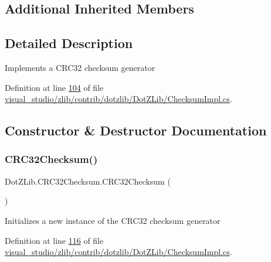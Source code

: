 \subsection*{Additional Inherited Members}


\subsection{Detailed Description}
Implements a C\+R\+C32 checksum generator 



Definition at line \hyperlink{visual__studio_2zlib_2contrib_2dotzlib_2_dot_z_lib_2_checksum_impl_8cs_source_l00104}{104} of file \hyperlink{visual__studio_2zlib_2contrib_2dotzlib_2_dot_z_lib_2_checksum_impl_8cs_source}{visual\+\_\+studio/zlib/contrib/dotzlib/\+Dot\+Z\+Lib/\+Checksum\+Impl.\+cs}.



\subsection{Constructor \& Destructor Documentation}
\mbox{\label{class_dot_z_lib_1_1_c_r_c32_checksum_aae1fb7dbf6c57d17c321d0065cd608ca}} 
\subsubsection{\texorpdfstring{C\+R\+C32\+Checksum()}{CRC32Checksum()}\hspace{0.1cm}{\footnotesize\ttfamily [1/4]}}
{\footnotesize\ttfamily Dot\+Z\+Lib.\+C\+R\+C32\+Checksum.\+C\+R\+C32\+Checksum (\begin{DoxyParamCaption}{ }\end{DoxyParamCaption})\hspace{0.3cm}{\ttfamily [inline]}}



Initializes a new instance of the C\+R\+C32 checksum generator 



Definition at line \hyperlink{visual__studio_2zlib_2contrib_2dotzlib_2_dot_z_lib_2_checksum_impl_8cs_source_l00116}{116} of file \hyperlink{visual__studio_2zlib_2contrib_2dotzlib_2_dot_z_lib_2_checksum_impl_8cs_source}{visual\+\_\+studio/zlib/contrib/dotzlib/\+Dot\+Z\+Lib/\+Checksum\+Impl.\+cs}.

